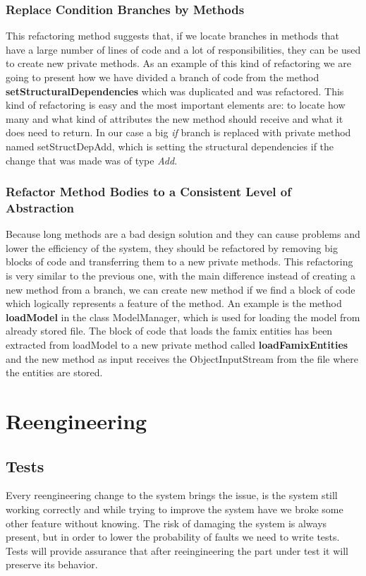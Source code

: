 \documentclass{article}
\begin{document}
\subsubsection{Replace Condition Branches by Methods}
This refactoring method suggests that, if we locate branches in methods that have a large number of lines of code and a lot of responsibilities, they can be used to create new private methods. As an example of this kind of refactoring we are going to present how we have divided a branch of code from the method \textbf{setStructuralDependencies} which was duplicated and was refactored. This kind of refactoring is easy and the most important elements are: to locate how many and what kind of attributes the new method should receive and what it does need to return. In our case a big \emph{if} branch is replaced with private method named setStructDepAdd, which is setting the structural dependencies if the change that was made was of type \emph{Add}.

\subsubsection{Refactor Method Bodies to a Consistent Level of Abstraction}
Because long methods are a bad design solution and they can cause problems and lower the efficiency of the system, they should be refactored by removing big blocks of code and transferring them to a new private methods. This refactoring is very similar to the previous one, with the main difference instead of creating a new method from a branch, we can create new method if we find a block of code which logically represents a feature of the method. An example is the method \textbf{loadModel} in the class ModelManager, which is used for loading the model from already stored file. The block of code that loads the famix entities has been extracted from loadModel to a new private method called \textbf{loadFamixEntities} and the new method as input receives the ObjectInputStream from the file where the entities are stored.

\section{Reengineering}

\subsection{Tests}
Every reengineering change to the system brings the issue, is the system still working correctly and while trying to improve the system have we broke some other feature without knowing. The risk of damaging the system is always present, but in order to lower the probability of faults we need to write tests. Tests will provide assurance that after reeingineering the part under test it will preserve its behavior.
\end{document}
